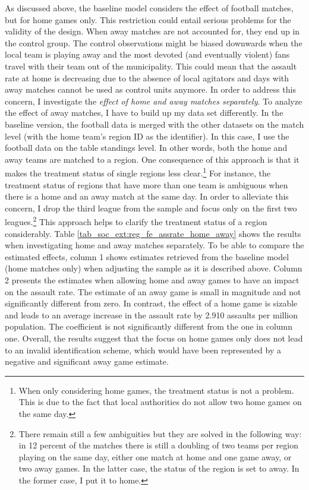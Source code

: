 As discussed above, the baseline model considers the effect of football matches, but for home games only. This restriction could entail serious problems for the validity of the design. When away matches are not accounted for, they end up in the control group. The control observations might be biased downwards when the local team is playing away and the most devoted (and eventually violent) fans travel with their team out of the municipality. This could mean that the assault rate at home is decreasing due to the absence of local agitators and days with away matches cannot be used as control units anymore. In order to address this concern, I investigate the \textit{effect of home and away matches separately}. To analyze the effect of away matches, I have to build up my data set differently. In the baseline version, the football data is merged with the other datasets on the match level (with the home team's region ID as the identifier). In this case, I use the football data on the table standings level. In other words, both the home and away teams are matched to a region. One consequence of this approach is that it makes the treatment status of single regions less clear.\footnote{When only considering home games, the treatment status is not a problem. This is due to the fact that local authorities do not allow two home games on the same day.} For instance, the treatment status of regions that have more than one team is ambiguous when there is a home and an away match at the same day. In order to alleviate this concern, I drop the third league from the sample and focus only on the first two leagues.\footnote{There remain still a few ambiguities but they are solved in the following way: in 12 percent of the matches there is still a doubling of two teams per region playing on the same day, either one match at home and one game away, or two away games. In the latter case, the status of the region is set to away. In the former case, I put it to home.} This approach helps to clarify the treatment status of a region considerably. Table \ref{tab_soc_ext:reg_fe_assrate_home_away} shows the results when investigating home and away matches separately. To be able to compare the estimated effects, column 1 shows estimates retrieved from the baseline model (home matches only) when adjusting the sample as it is described above. Column 2 presents the estimates when allowing home and away games to have an impact on the assault rate. The estimate of an away game is small in magnitude and not significantly different from zero. In contrast, the effect of a home game is sizable and leads to an average increase in the assault rate by 2.910 assaults per million population. The coefficient is not significantly different from the one in column one. Overall, the results suggest that the focus on home games only does not lead to an invalid identification scheme, which would have been represented by a negative and significant away game estimate. 




